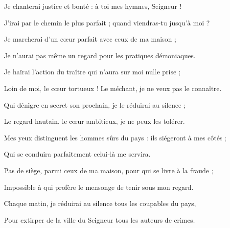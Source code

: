 \item Je chanterai justice et bonté : à toi mes hymnes, Seigneur !
\item J'irai par le chemin le plus parfait ; quand viendras-tu jusqu'à moi ? 
\item Je marcherai d'un cœur parfait avec ceux de ma maison ;
\item Je n'aurai pas même un regard pour les pratiques démoniaques. 
\item Je haïrai l'action du traître qui n'aura sur moi nulle prise ;
\item Loin de moi, le cœur tortueux ! Le méchant, je ne veux pas le connaître.
\item Qui dénigre en secret son prochain, je le réduirai au silence ;
\item Le regard hautain, le cœur ambitieux, je ne peux les tolérer.
\item Mes yeux distinguent les hommes sûrs du pays : ils siégeront à mes côtés ;
\item Qui se conduira parfaitement celui-là me servira.
\item Pas de siège, parmi ceux de ma maison, pour qui se livre à la fraude ;
\item Impossible à qui profère le mensonge de tenir sous mon regard.
\item Chaque matin, je réduirai au silence tous les coupables du pays,
\item Pour extirper de la ville du Seigneur tous les auteurs de crimes.

